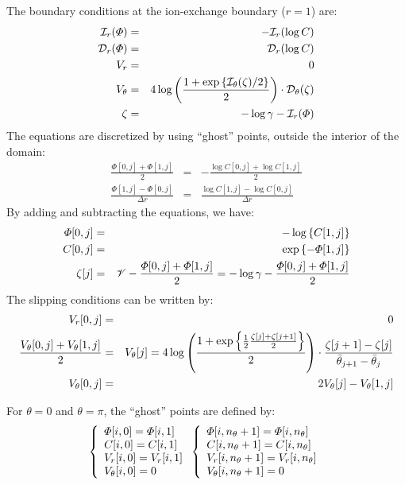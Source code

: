 The boundary conditions at the ion-exchange boundary ($r=1$) are:
\begin{eqnarray}
\cI_r(\varPhi) &=& -\cI_r(\log C) \\
\cD_r(\varPhi) &=& \cD_r(\log C) \\
V_r &=& 0 \\
V_\theta &=& 4\log\pars{\frac{1 + \exp\left\{\cI_\theta(\zeta)/2\right\}}{2}} \cdot 
			\cD_\theta(\zeta) \\
 \nonumber \zeta &=& - \log \gamma - \cI_r(\varPhi)
\end{eqnarray}
The equations are discretized by using ``ghost'' points, outside the interior of the domain:
\begin{eqnarray}
 \nonumber \frac{\varPhi[0,j] + \varPhi[1,j]}{2} &=& 
	-\frac{\log C[0,j] + \log C[1,j]}{2} \\
 \nonumber \frac{\varPhi[1,j] - \varPhi[0,j]}{\Delta r} &=& 
	\frac{\log C[1,j] - \log C[0,j]}{\Delta r} 
\end{eqnarray}
By adding and subtracting the equations, we have:
\begin{eqnarray}
\varPhi[0,j] &=& -\log\brcs{C[1,j]} \\
C[0,j] &=& \exp\brcs{-\varPhi[1,j]} \\
 \nonumber \zeta[j] &=& \cV -\frac{\varPhi[0,j] + \varPhi[1,j]}{2} 
                     = -\log\gamma -\frac{\varPhi[0,j] + \varPhi[1,j]}{2}
\end{eqnarray}
The slipping conditions can be written by:
\begin{eqnarray}
V_r[0,j] &=& 0 \\
\frac{V_\theta[0,j] + V_\theta[1,j]}{2} &=& V_\theta[j] = 
4\log\pars{\frac{1 + \exp\left\{\frac{1}{2}\frac{\zeta[j] + \zeta[j+1]}{2}\right\}}{2}} 
\cdot \frac{\zeta[j+1] - \zeta[j]}{\bar{\theta}_{j+1} - \bar{\theta}_{j}} \\
 \nonumber V_\theta[0,j] &=& 2 V_\theta[j] - V_\theta[1,j]
\end{eqnarray}

For $\theta = 0$ and $\theta = \pi$, the ``ghost'' points are defined by:
\begin{eqnarray} 
\brc{l}{
\varPhi[i, 0] = \varPhi[i, 1] \\
C[i, 0] = C[i, 1] \\
V_r[i, 0] = V_r[i, 1] \\
V_\theta[i, 0] = 0
} 
\brc{l}{
\varPhi[i, n_\theta+1] = \varPhi[i, n_\theta] \\
C[i, n_\theta+1] = C[i, n_\theta] \\
V_r[i, n_\theta+1] = V_r[i, n_\theta] \\
V_\theta[i, n_\theta+1] = 0
} 
\end{eqnarray}

